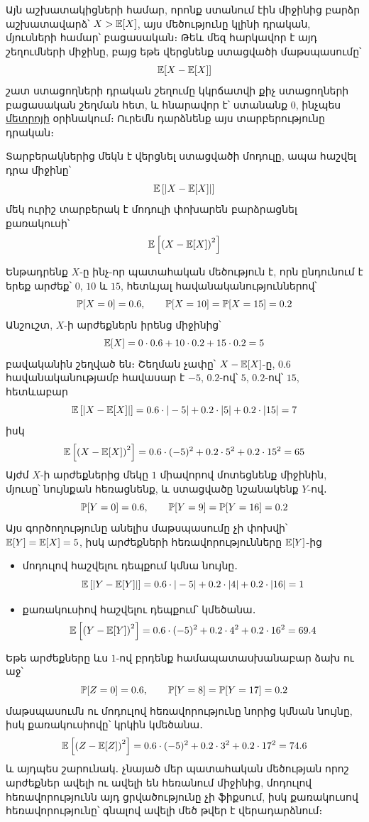 Այն աշխատակիցների համար, որոնք ստանում էին միջինից բարձր աշխատավարձ՝ $X > \mathbb{E}[X]$, այս մեծությունը կլինի դրական, մյուսների համար՝ բացասական։ Թեև մեզ հարկավոր է այդ շեղումների միջինը, բայց եթե վերցնենք ստացվածի մաթսպասումը՝
\[
\mathbb{E}[X - \mathbb{E}[X]]
\]
շատ ստացողների դրական շեղումը կկրճատվի քիչ ստացողների բա\-ցա\-սական շեղման հետ, և հնարավոր է՝ ստանանք $0$, ինչպես \hyperref[metro]{\color{OliveGreen} մետրոյի} օրինակում։ Ուրեմն դարձնենք այս տարբերությունը դրական։

Տարբերակներից մեկն է վերցնել ստացվածի մոդուլը, ապա հաշվել դրա միջինը՝
\[
\mathbb{E}\left[\left|X - \mathbb{E}[X]\right|\right]
\]
մեկ ուրիշ տարբերակ է մոդուլի փոխարեն բարձրացնել քառակուսի՝
\[
\mathbb{E}\left[\left(X - \mathbb{E}[X]\right)^2\right]
\]


\begin{example}
Ենթադրենք $X$-ը ինչ-որ պատահական մեծություն է, որն ընդունում է երեք արժեք՝ $0$, $10$ և $15$, հետևյալ հավանականություն\-նե\-րով՝
\[
\mathbb{P}[X = 0] = 0.6, \qquad \mathbb{P}[X = 10] = \mathbb{P}[X = 15] = 0.2
\]
Անշուշտ, $X$-ի արժեքներն իրենց միջինից՝
\[
\mathbb{E}[X] = 0 \cdot 0.6 + 10 \cdot 0.2 + 15 \cdot 0.2 = 5
\]
բավականին շեղված են։ Շեղման չափը՝ $X-\mathbb{E}[X]$-ը, $0.6$ հավանակա\-նու\-թյամբ հավասար է $-5$, $0.2$-ով՝ $5$, $0.2$-ով՝ $15$, հետևաբար
\[
\mathbb{E}\left[\left|X - \mathbb{E}[X]\right|\right]
= 
0.6 \cdot |-5| + 0.2 \cdot |5| + 0.2 \cdot |15|
=
7
\]
իսկ 
\[
\mathbb{E}\left[\left(X - \mathbb{E}[X]\right)^2\right]
=
0.6 \cdot (-5)^2 + 0.2 \cdot 5^2 + 0.2 \cdot 15^2
= 
65
\]
Այժմ $X$-ի արժեքներից մեկը $1$ միավորով մոտեցնենք միջինին, մյուսը՝ նույնքան հեռացնենք, և ստացվածը նշանակենք $Y$-ով․
\[
\mathbb{P}[Y = 0] = 0.6, \qquad \mathbb{P}[Y = 9] = \mathbb{P}[Y = 16] = 0.2
\]
Այս գործողությունը անելիս մաթսպասումը չի փոխվի՝ $\mathbb{E}[Y]=\mathbb{E}[X]=5$, իսկ արժեքների հեռավորությունները $\mathbb{E}[Y]$-ից
\begin{itemize}
\item մոդուլով հաշվելու դեպքում կմնա նույնը․
\[
\mathbb{E}\left[\left|Y - \mathbb{E}[Y]\right|\right]
=
0.6 \cdot |-5| + 0.2 \cdot |4| + 0.2 \cdot |16|
= 
1
\]
\item քառակուսիով հաշվելու դեպքում՝ կմեծանա․
\[
\mathbb{E}\left[\left(Y - \mathbb{E}[Y]\right)^2\right]
=
0.6 \cdot (-5)^2 + 0.2 \cdot 4^2 + 0.2 \cdot 16^2
= 
69.4
\]
\end{itemize}

Եթե արժեքները ևս $1$-ով բրդենք համապատասխանաբար ձախ ու աջ՝
\[
\mathbb{P}[Z = 0] = 0.6, \qquad \mathbb{P}[Y = 8] = \mathbb{P}[Y = 17] = 0.2
\]
մաթսպասումն ու մոդուլով հեռավորությունը նորից կմնան նույնը, իսկ քառակուսիովը՝ կրկին կմեծանա․
\[
\mathbb{E}\left[\left(Z - \mathbb{E}[Z]\right)^2\right]
=
0.6 \cdot (-5)^2 + 0.2 \cdot 3^2 + 0.2 \cdot 17^2
= 
74.6
\] 
և այդպես շարունակ․ չնայած մեր պատահական մեծության որոշ ար\-ժեք\-ներ ավելի ու ավելի են հեռանում միջինից, մոդուլով հեռա\-վո\-րու\-թյունն այդ ցրվածությունը չի ֆիքսում, իսկ քառակուսով հե\-ռա\-վո\-րու\-թյունը՝ գնալով ավելի մեծ թվեր է վերադարձնում։
\end{example}

